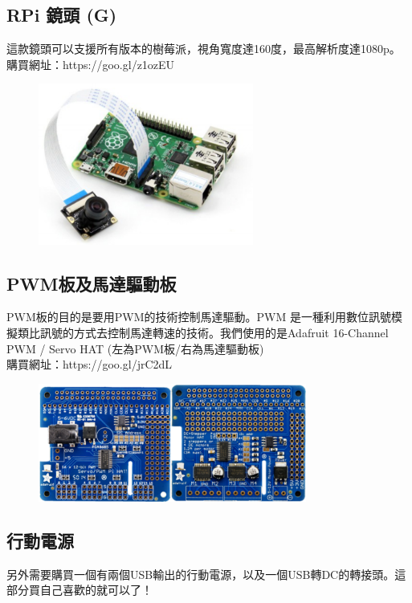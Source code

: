 \documentclass{article}
\begin{document}
\subsection{RPi 鏡頭 (G)}
這款鏡頭可以支援所有版本的樹莓派，視角寬度達160度，最高解析度達1080p。
\\購買網址：https://goo.gl/z1ozEU
\\
\begin{figure}[htp]
    \begin{center}
        \includegraphics[width=200pt]{pic/1_1_4.png}
    \end{center}
\end{figure}

\subsection{PWM板及馬達驅動板}
PWM板的目的是要用PWM的技術控制馬達驅動。PWM 是一種利用數位訊號模擬類比訊號的方式去控制馬達轉速的技術。我們使用的是Adafruit 16-Channel
PWM / Servo HAT (左為PWM板/右為馬達驅動板)
\\購買網址：https://goo.gl/jrC2dL
\\
\begin{figure}[htp]
    \begin{center}
        \includegraphics[width=250pt]{pic/1_1_5.png}
    \end{center}
\end{figure}

\subsection{行動電源}
另外需要購買一個有兩個USB輸出的行動電源，以及一個USB轉DC的轉接頭。這部分買自己喜歡的就可以了！
\end{document}
